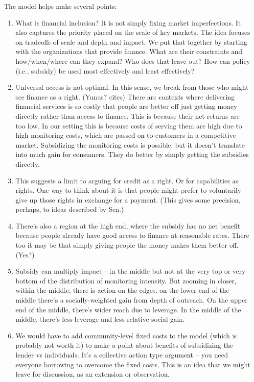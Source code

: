\documentclass[letterpaper, 12pt]{article}
\begin{document}
The model helps make several points:
\begin{enumerate}
\item What is financial inclusion? It is not simply fixing market imperfections. It also captures the priority placed on the scale of key markets. The idea focuses on tradeoffs of scale and depth and impact. We put that together by starting with the organizations that provide finance. What are their constraints and how/when/where can they expand? Who does that leave out? How can policy (i.e., subsidy) be used most effectively and least effectively?
\item Universal access is not optimal. In this sense, we break from those who might see finance as a right. (Yunus? cites) There are contexts where delivering financial services is so costly that people are better off just getting money directly rather than access to finance. This is because their net returns are too low. In our setting this is because costs of serving them are high due to high monitoring costs, which are passed on to customers in a competitive market. Subsidizing the monitoring costs is possible, but it doesn't translate into much gain for consumers. They do better by simply getting  the subsidies directly. 
\item This suggests a limit to arguing for credit as a right. Or for capabilities as rights. One way to think about it is that people might prefer to voluntarily give up those rights in exchange for a payment. (This gives some precision, perhaps, to ideas described by Sen.)
\item There's also a region at the high end, where the subsidy has no net benefit because people already have good access to finance at reasonable rates. There too it may be that simply giving people the money makes them better off. (Yes?)
\item Subsidy can multiply impact -- in the middle but not at the very top or very bottom of the distribution of monitoring intensity. But zooming in closer, within the middle, there is action on the edges. on the lower end of the middle there's a socially-weighted gain from depth of outreach. On the upper end of the middle, there's wider reach due to leverage. In the middle of the middle, there's less leverage and less relative social gain. 
\item We would have to add community-level fixed costs to the model (which is probably not worth it) to make a point about benefits of subsidizing the lender vs individuals. It's a collective action type argument -- you need everyone borrowing to overcome the fixed costs. This is an idea that we might leave for discussion, as an extension or observation.

\end{enumerate}
\end{document}
